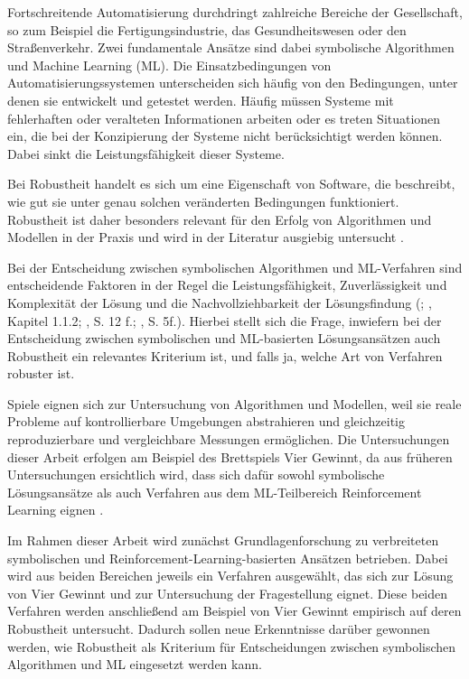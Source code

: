 Fortschreitende Automatisierung durchdringt zahlreiche Bereiche der Gesellschaft, so zum Beispiel die Fertigungsindustrie, das Gesundheitswesen oder den Straßenverkehr. Zwei fundamentale Ansätze sind dabei symbolische Algorithmen und Machine Learning (ML). Die Einsatzbedingungen von Automatisierungssystemen unterscheiden sich häufig von den Bedingungen, unter denen sie entwickelt und getestet werden. Häufig müssen Systeme mit fehlerhaften oder veralteten Informationen arbeiten oder es treten Situationen ein, die bei der Konzipierung der Systeme nicht berücksichtigt werden können. Dabei sinkt die Leistungsfähigkeit dieser Systeme.

Bei Robustheit handelt es sich um eine Eigenschaft von Software, die beschreibt, wie gut sie unter genau solchen veränderten Bedingungen funktioniert. Robustheit ist daher besonders relevant für den Erfolg von Algorithmen und Modellen in der Praxis und wird in der Literatur ausgiebig untersucht \cite{Micskei.2012} \cite{Moos.2022} \cite{Ni.2021}.

Bei der Entscheidung zwischen symbolischen Algorithmen und ML-Verfahren sind entscheidende Faktoren in der Regel die Leistungsfähigkeit, Zuverlässigkeit und Komplexität der Lösung und die Nachvollziehbarkeit der Lösungsfindung (\cite{Dabas.2022}; \cite{Ferguson.January2019}, Kapitel 1.1.2; \cite{Humm.2020}, S. 12 f.; \cite{Früh.2022}, S. 5f.). Hierbei stellt sich die Frage, inwiefern bei der Entscheidung zwischen symbolischen und ML-basierten Lösungsansätzen auch Robustheit ein relevantes Kriterium ist, und falls ja, welche Art von Verfahren robuster ist.

Spiele eignen sich zur Untersuchung von Algorithmen und Modellen, weil sie reale Probleme auf kontrollierbare Umgebungen abstrahieren und gleichzeitig reproduzierbare und vergleichbare Messungen ermöglichen. Die Untersuchungen dieser Arbeit erfolgen am Beispiel des Brettspiels Vier Gewinnt, da aus früheren Untersuchungen ersichtlich wird, dass sich dafür sowohl symbolische Lösungsansätze als auch Verfahren aus dem ML-Teilbereich Reinforcement Learning eignen \cite{Qiu.2022} \cite{Sheoran.2022} \cite{Taylor.2024} \cite{Dabas.2022} \cite{Wäldchen.2022}.

Im Rahmen dieser Arbeit wird zunächst Grundlagenforschung zu verbreiteten symbolischen und Reinforcement-Learning-basierten Ansätzen betrieben. Dabei wird aus beiden Bereichen jeweils ein Verfahren ausgewählt, das sich zur Lösung von Vier Gewinnt und zur Untersuchung der Fragestellung eignet. Diese beiden Verfahren werden anschließend am Beispiel von Vier Gewinnt empirisch auf deren Robustheit untersucht. Dadurch sollen neue Erkenntnisse darüber gewonnen werden, wie Robustheit als Kriterium für Entscheidungen zwischen symbolischen Algorithmen und ML eingesetzt werden kann.
